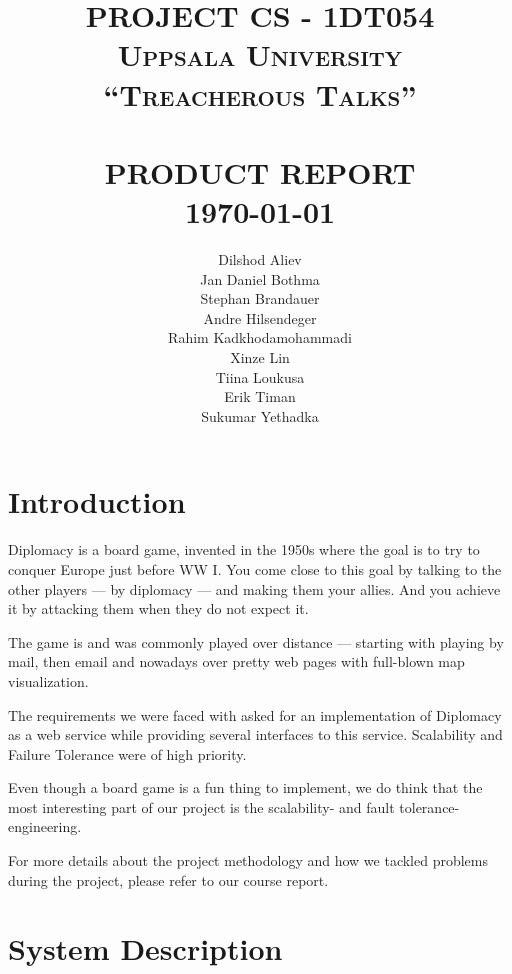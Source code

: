 \documentclass[11pt,a4paper]{report}
\title{    
            \large \textbf{\uppercase{Project CS - 1DT054}}\\    %
            \large \textsc{Uppsala University}\\[2.0cm]    %
            \normalsize \textsc{``Treacherous Talks''}   %
             \\[2.0cm]                                  %
            \HRule{0.5pt} \\                            %
            \LARGE \textbf{\uppercase{Product Report}}   %
            \HRule{2pt} \\ [0.5cm]                      %
            \normalsize \today                          %
        }
\author{Dilshod Aliev\\
        Jan Daniel Bothma\\
        Stephan Brandauer\\
        Andre Hilsendeger\\
        Rahim Kadkhodamohammadi\\
        Xinze Lin\\
        Tiina Loukusa\\
        Erik Timan\\
        Sukumar Yethadka\\
        }
\makeatletter
\newcommand{\hi}[1]{{\color{red}\em #1\/}\\}
\def\printtitle{
    {\centering \@title\par}}
\def\printauthor{
    {\centering \large \@author}}
\makeatother
\begin{document}
\thispagestyle{empty}                %

\printtitle
\vfill
\printauthor

\tableofcontents


\chapter{Introduction}
Diplomacy\cite{diplomacy} is a board game, invented in the 1950s where the goal
is to try to conquer Europe just before WW I. You come close to this goal by
talking to the other players --- by diplomacy --- and making them your allies.
And you achieve it by attacking them when they do not expect it.

The game is and was commonly played over distance --- starting with playing by
mail, then email and nowadays over pretty web pages with full-blown map
visualization.

The requirements we were faced with asked for an implementation of Diplomacy as 
a web service while providing several interfaces to this service. Scalability
and Failure Tolerance were of high priority. 

Even though a board game is a fun thing to implement, we do think that the most
interesting part of our project is the scalability- and fault tolerance-
engineering.

For more details about the project methodology and 
how we tackled problems during the project, please refer to our course report.

\chapter{System Description}
\end{document}

